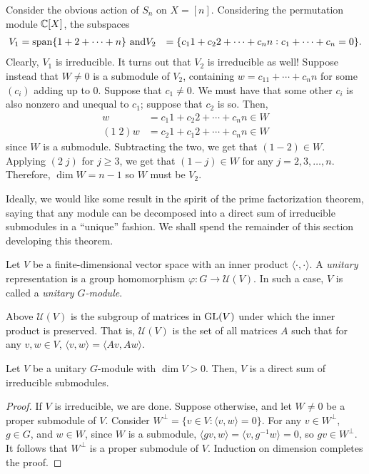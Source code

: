 	\begin{fex}
		Consider the obvious action of $S_n$ on $X = [n]$. Considering the permutation module $\mathbb{C}[X]$, the subspaces
		\begin{align*}
			V_1 &= \operatorname{span}\{1+2+\cdots+n\} \text{ and}
			V_2 &= \{c_11 + c_22 + \cdots + c_nn : c_1 + \cdots + c_n = 0\}.
		\end{align*}
		Clearly, $V_1$ is irreducible. It turns out that $V_2$ is irreducible as well! Suppose instead that $W \ne 0$ is a submodule of $V_2$, containing $w = c_11 + \cdots + c_nn$ for some $(c_i)$ adding up to $0$. Suppose that $c_1 \ne 0$. We must have that some other $c_i$ is also nonzero and unequal to $c_1$; suppose that $c_2$ is so. Then,
		\begin{align*}
			w &= c_1 1 + c_2 2 + \cdots + c_nn \in W \\
			(1\; 2) w &= c_2 1 + c_1 2 + \cdots + c_n n \in W
		\end{align*}
		since $W$ is a submodule. Subtracting the two, we get that $(1-2) \in W$. Applying $(2\; j)$ for $j \ge 3$, we get that $(1-j) \in W$ for any $j = 2,3,\ldots,n$. Therefore, $\dim W = n-1$ so $W$ must be $V_2$.
	\end{fex}

	Ideally, we would like some result in the spirit of the prime factorization theorem, saying that any module can be decomposed into a direct sum of irreducible submodules in a ``unique'' fashion. We shall spend the remainder of this section developing this theorem.

	\begin{fdef}
		Let $V$ be a finite-dimensional vector space with an inner product $\langle \cdot,\cdot\rangle$. A \emph{unitary} representation is a group homomorphism $\varphi : G \to \mathcal{U}(V)$. In such a case, $V$ is called a \emph{unitary $G$-module}.
	\end{fdef}
	Above $\mathcal{U}(V)$ is the subgroup of matrices in $\operatorname{GL}(V)$ under which the inner product is preserved. That is, $\mathcal{U}(V)$ is the set of all matrices $A$ such that for any $v,w \in V$, $\langle v,w\rangle = \langle Av,Aw\rangle$.

	\begin{lemma}
		Let $V$ be a unitary $G$-module with $\dim V > 0$. Then, $V$ is a direct sum of irreducible submodules.
	\end{lemma}
	\begin{proof}
		If $V$ is irreducible, we are done. Suppose otherwise, and let $W \ne 0$ be a proper submodule of $V$. Consider $W^\perp = \{ v \in V : \langle v,w\rangle = 0 \}$. For any $v \in W^\perp$, $g \in G$, and $w \in W$, since $W$ is a submodule, $\langle gv,w\rangle = \langle v,g^{-1}w\rangle = 0$, so $gv \in W^\perp$. It follows that $W^\perp$ is a proper submodule of $V$. Induction on dimension completes the proof. 
	\end{proof}

